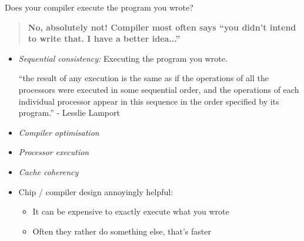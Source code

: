 \documentclass[10pt,times]{beamer}
\begin{document}
\begin{frame}{Does your compiler execute the program you wrote?}

\begin{quotation}
\textbf{No, absolutely not! Compiler most often says ``you didn't intend to 
write 
that. I have a better idea...''}
\end{quotation}
\begin{itemize}
\item \textit{Sequential consistency:} Executing the program you wrote.

``the result of any execution is the same as if the operations of all the
processors were executed in some sequential order, and the operations of
each individual processor appear in this sequence in the order specified
by its program.'' - Lesslie Lamport

\item \textit{Compiler optimisation}
\item \textit{Processor execution}
\item \textit{Cache coherency}
\item Chip / compiler design annoyingly helpful:
\begin{itemize}
\item It can be expensive to exactly execute what you wrote
\item Often they rather do something else, that's faster
\end{itemize}
\end{itemize}
\end{frame}
\end{document}
